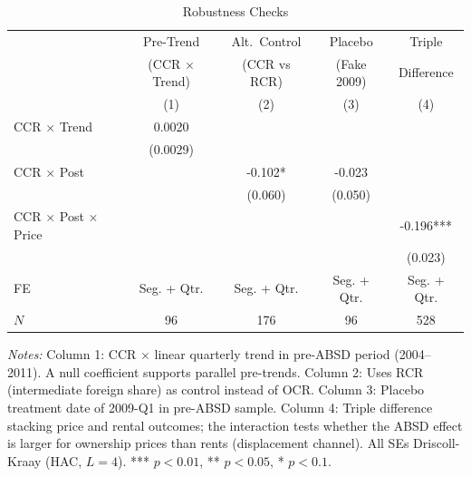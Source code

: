 \begin{table}[htbp]
\centering
\caption{Robustness Checks}\label{tab:robust}
\begin{threeparttable}
\begin{tabular}{lcccc}
\toprule
 & Pre-Trend & Alt.\ Control & Placebo & Triple \\
 & (CCR $\times$ Trend) & (CCR vs RCR) & (Fake 2009) & Difference \\
 & (1) & (2) & (3) & (4) \\
\midrule
CCR $\times$ Trend & 0.0020 & & & \\
 & (0.0029) & & & \\
CCR $\times$ Post & & -0.102* & -0.023 & \\
 & & (0.060) & (0.050) & \\
CCR $\times$ Post $\times$ Price & & & & -0.196*** \\
 & & & & (0.023) \\
\midrule
FE & Seg. + Qtr. & Seg. + Qtr. & Seg. + Qtr. & Seg. + Qtr. \\
$N$ & 96 & 176 & 96 & 528 \\
\bottomrule
\end{tabular}
\begin{tablenotes}[flushleft]\small
\item \textit{Notes:} Column 1: CCR $\times$ linear quarterly trend in pre-ABSD period (2004--2011). A null coefficient supports parallel pre-trends. Column 2: Uses RCR (intermediate foreign share) as control instead of OCR. Column 3: Placebo treatment date of 2009-Q1 in pre-ABSD sample. Column 4: Triple difference stacking price and rental outcomes; the interaction tests whether the ABSD effect is larger for ownership prices than rents (displacement channel). All SEs Driscoll-Kraay (HAC, $L=4$). *** $p<0.01$, ** $p<0.05$, * $p<0.1$.
\end{tablenotes}
\end{threeparttable}
\end{table}

